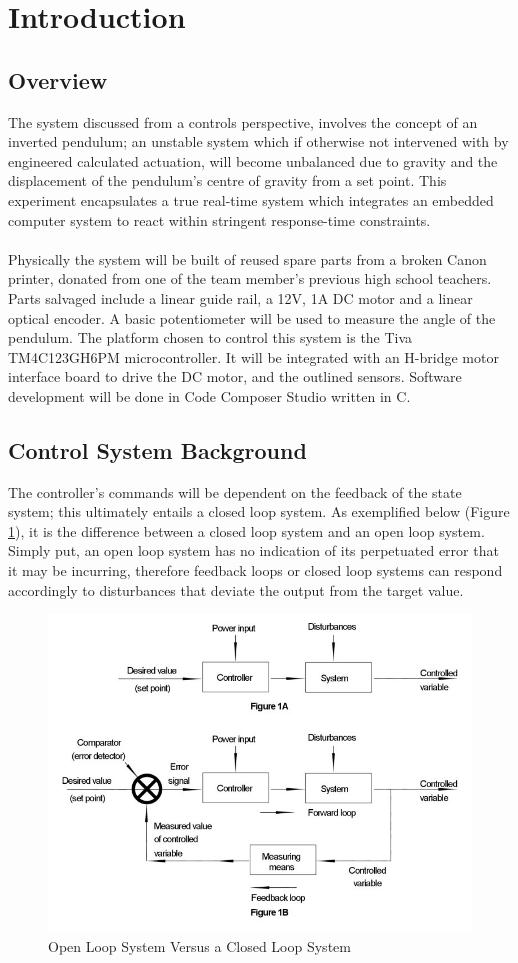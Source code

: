 \documentclass[12pt]{article}
\begin{document}
\newpage
\tableofcontents
\listoffigures
\newpage

\section{Introduction}
\subsection{Overview}
The system discussed from a controls perspective, involves the concept of an inverted pendulum; an unstable system which if otherwise not intervened with by engineered calculated actuation, will become unbalanced due to gravity and the displacement of the pendulum's centre of gravity from a set point. This experiment encapsulates a true real-time system which integrates an embedded computer system to react within stringent response-time constraints. 
\\\\
Physically the system will be built of reused spare parts from a broken Canon printer, donated from one of the team member's previous high school teachers. Parts salvaged include a linear guide rail, a 12V, 1A DC motor and a linear optical encoder. A basic potentiometer will be used to measure the angle of the pendulum. The platform chosen to control this system is the Tiva TM4C123GH6PM microcontroller. It will be integrated with an H-bridge motor interface board to drive the DC motor, and the outlined sensors. Software development will be done in Code Composer Studio written in C.
\subsection{Control System Background}
The controller's commands will be dependent on the feedback of the state system; this ultimately entails a closed loop system. As exemplified below (Figure \ref{fig:loops}), it is the difference between a closed loop system and an open loop system. Simply put, an open loop system has no indication of its perpetuated error that it may be incurring, therefore feedback loops or closed loop systems can respond accordingly to disturbances that deviate the output from the target value.
\begin{figure}[H]
    \centering
    \includegraphics[width=.70\linewidth]{figures/closedopenloop.jpg}
    \caption{Open Loop System Versus a Closed Loop System \cite{OCLoop}}
    \label{fig:loops}
\end{figure}
\end{document}
